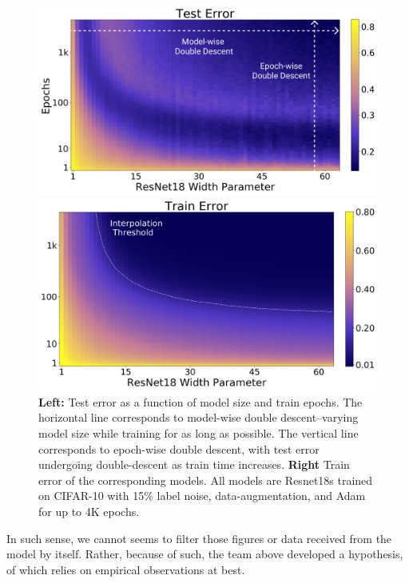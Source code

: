 \begin{figure}[t!]
\centering
\begin{minipage}{.512\textwidth}
  \centering
  \includegraphics[width=1\textwidth]{img/Intro-ocean-test.png}
\end{minipage}%
\begin{minipage}{.488\textwidth}
  \centering
  \includegraphics[width=1\textwidth]{img/Rn-cifar10-p15-adam-aug-train.png}
\end{minipage}
\caption{{\bf Left:} Test error as a function of model size and train epochs. The horizontal line corresponds to model-wise double descent--varying model size while training for as long as possible.
The vertical line corresponds to epoch-wise double descent,
with test error undergoing double-descent as train time increases.
{\bf Right} Train error of the corresponding models.
All models are Resnet18s trained on CIFAR-10 with 15\% label noise,
data-augmentation, and Adam for up to 4K epochs.}
\label{fig:unified}
\end{figure}

In such sense, we cannot seems to filter those figures or data received from the model by itself. Rather, because of such, the team above developed a hypothesis, of which relies on empirical observations at best. 

